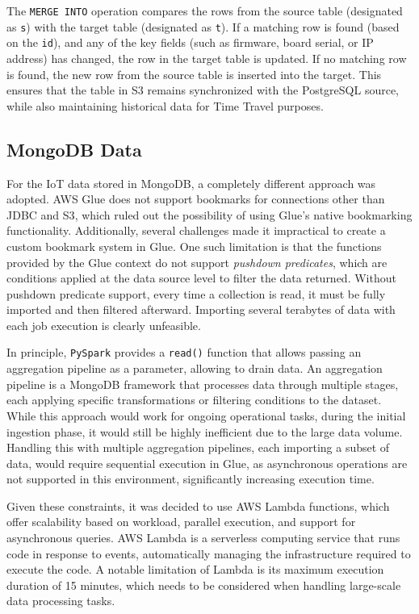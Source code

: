 The \texttt{MERGE INTO} operation compares the rows from the source table (designated as \texttt{s}) with the target table (designated as \texttt{t}). If a matching row is found (based on the \texttt{id}), and any of the key fields (such as firmware, board serial, or IP address) has changed, the row in the target table is updated. If no matching row is found, the new row from the source table is inserted into the target. This ensures that the table in \ac{S3} remains synchronized with the PostgreSQL source, while also maintaining historical data for Time Travel purposes.

\subsection{MongoDB Data}
For the \ac{IoT} data stored in MongoDB, a completely different approach was adopted. \ac{AWS} Glue does not support bookmarks for connections other than \ac{JDBC} and \ac{S3}, which ruled out the possibility of using Glue's native bookmarking functionality. Additionally, several challenges made it impractical to create a custom bookmark system in Glue. One such limitation is that the functions provided by the Glue context do not support \textit{pushdown predicates}, which are conditions applied at the data source level to filter the data returned. Without pushdown predicate support, every time a collection is read, it must be fully imported and then filtered afterward. Importing several terabytes of data with each job execution is clearly unfeasible.

In principle, \texttt{PySpark} provides a \texttt{read()} function that allows passing an aggregation pipeline as a parameter, allowing to drain data. An aggregation pipeline is a MongoDB framework that processes data through multiple stages, each applying specific transformations or filtering conditions to the dataset. While this approach would work for ongoing operational tasks, during the initial ingestion phase, it would still be highly inefficient due to the large data volume. Handling this with multiple aggregation pipelines, each importing a subset of data, would require sequential execution in Glue, as asynchronous operations are not supported in this environment, significantly increasing execution time.

Given these constraints, it was decided to use \ac{AWS} Lambda functions, which offer scalability based on workload, parallel execution, and support for asynchronous queries. \ac{AWS} Lambda is a serverless computing service that runs code in response to events, automatically managing the infrastructure required to execute the code. A notable limitation of Lambda is its maximum execution duration of 15 minutes, which needs to be considered when handling large-scale data processing tasks.

